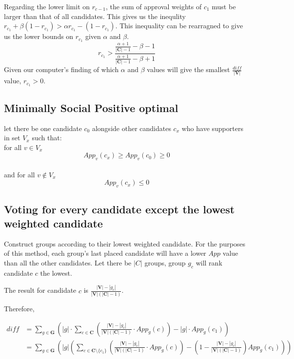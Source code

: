 \documentclass{article}
\begin{document}
Regarding the lower limit on $r_{c-1}$, the sum of approval weights of $c_1$ must be larger than that of all candidates. This gives us the inequlity $r_{c_1}+\beta (1-r_{c_1}) > \alpha r_{c_1} - (1-r_{c_1})$.
This inequality can be rearragned to give us the lower bounds on $r_{c_1}$ given $\alpha$ and $\beta$.
\begin{equation}
    r_{c_1} > \frac{\frac{\alpha + 1}{|\boldsymbol{C}| - 1}- \beta - 1}{\frac{\alpha + 1}{|\boldsymbol{C}| - 1}- \beta + 1}
\end{equation}
Given our computer's finding of which $\alpha$ and $\beta$ values will give the smallest $\frac{diff}{|\boldsymbol{V}|}$ value, $r_{c_1} > 0$.

\subsection{Minimally Social Positive optimal}

let there be one candidate $c_0$ alongside other candidates $c_x$ who have supporters in set $V_x$ such that:
\\for all $v \in V_x$
\begin{equation}
    App_v(c_x) \geq App_v(c_0) \geq 0
\end{equation}
\\and for all $v \notin V_x$
\begin{equation}
    App_v(c_x) \leq 0
\end{equation}

\subsection{Voting for every candidate except the lowest weighted candidate}

Construct groups according to their lowest weighted candidate. For the purposes of this method, each group's last placed candidate will have a lower $App$ value than all the other candidates. Let there be $|C|$ groups, group $g_c$ will rank candidate $c$ the lowest.

The result for candidate $c$ is $\frac{|\boldsymbol{V}|-|g_c|}{|\boldsymbol{V}|(|\boldsymbol{C}|-1)}$.

Therefore,

\begin{equation}
\begin{aligned}
diff &= \sum^{}_{g \in \boldsymbol{G}}{\left(|g| \cdot \sum^{}_{c \in \boldsymbol{C}}{\left(\frac{|\boldsymbol{V}|-|g_c|}{|\boldsymbol{V}|(|\boldsymbol{C}|-1)} \cdot App_g(c)\right)} - |g| \cdot App_g(c_1) \right)}\\
&= \sum^{}_{g \in \boldsymbol{G}}{\left(|g| \left( \sum^{}_{c \in \boldsymbol{C} \setminus \{c_1\}}{\left(\frac{|\boldsymbol{V}|-|g_c|}{|\boldsymbol{V}|(|\boldsymbol{C}|-1)} \cdot App_g(c)\right)} - \left(1 - \frac{|\boldsymbol{V}|-|g_c|}{|\boldsymbol{V}|(|\boldsymbol{C}|-1)}\right)App_g(c_1) \right) \right)}
\end{aligned}
\end{equation} 
\end{document}
